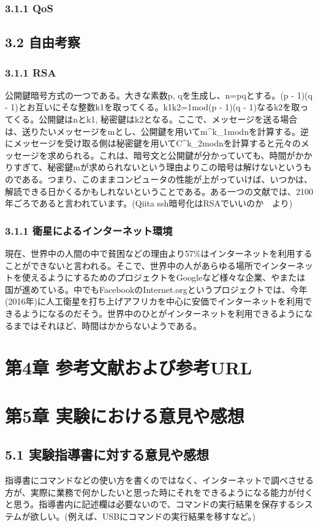\documentclass[12pt]{jreport}
\begin{document}
                \subsection*{3.1.1 QoS}

            \section*{3.2 自由考察}
                \subsection*{3.1.1 RSA}
                    公開鍵暗号方式の一つである。大きな素数p, qを生成し、n=pqとする。(p - 1)(q - 1)とお互いにそな整数k1を取ってくる。k1k2=1mod(p - 1)(q - 1)なるk2を取ってくる。公開鍵はnとk1, 秘密鍵はk2となる。ここで、メッセージを送る場合は、送りたいメッセージをmとし、公開鍵を用いてm^k_1modnを計算する。逆にメッセージを受け取る側は秘密鍵を用いてC^k_2modnを計算すると元々のメッセージを求められる。これは、暗号文と公開鍵が分かっていても、時間がかかりすぎて、秘密鍵mが求められないという理由よりこの暗号は解けないというものである。つまり、このままコンピュータの性能が上がっていけば、いつかは、解読できる日かくるかもしれないということである。ある一つの文献では、2100年ごろであると言われています。(Qiita ssh暗号化はRSAでいいのか　より)
                \subsection*{3.1.1 衛星によるインターネット環境}
                    現在、世界中の人間の中で貧困などの理由より57\%はインターネットを利用することができないと言われる。そこで、世界中の人があらゆる場所でインターネットを使えるようにするためのプロジェクトをGoogleなど様々な企業、やまたは国が進めている。中でもFacebookのInternet.orgというプロジェクトでは、今年(2016年)に人工衛星を打ち上げアフリカを中心に安価でインターネットを利用できるようになるのだそう。世界中のひとがインターネットを利用できるようになるまではそれほど、時間はかからないようである。


    \chapter*{第4章 参考文献および参考URL}

    \chapter*{第5章 実験における意見や感想}
        \section*{5.1 実験指導書に対する意見や感想}
            指導書にコマンドなどの使い方を書くのではなく、インターネットで調べさせる方が、実際に業務で何かしたいと思った時にそれをできるようになる能力が付くと思う。指導書内に記述欄は必要ないので、コマンドの実行結果を保存するシステムが欲しい。(例えば、USBにコマンドの実行結果を移すなど。)　
\end{document}
